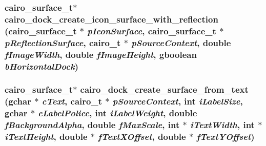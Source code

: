 \subsubsection{\setlength{\rightskip}{0pt plus 5cm}cairo\_\-surface\_\-t$\ast$ cairo\_\-dock\_\-create\_\-icon\_\-surface\_\-with\_\-reflection (cairo\_\-surface\_\-t $\ast$ {\em pIconSurface}, cairo\_\-surface\_\-t $\ast$ {\em pReflectionSurface}, cairo\_\-t $\ast$ {\em pSourceContext}, double {\em fImageWidth}, double {\em fImageHeight}, gboolean {\em bHorizontalDock})}\label{cairo-dock-surface-factory_8h_f291ea9a737e4c9f735517bedefbd6c2}


\subsubsection{\setlength{\rightskip}{0pt plus 5cm}cairo\_\-surface\_\-t$\ast$ cairo\_\-dock\_\-create\_\-surface\_\-from\_\-text (gchar $\ast$ {\em cText}, cairo\_\-t $\ast$ {\em pSourceContext}, int {\em iLabelSize}, gchar $\ast$ {\em cLabelPolice}, int {\em iLabelWeight}, double {\em fBackgroundAlpha}, double {\em fMaxScale}, int $\ast$ {\em iTextWidth}, int $\ast$ {\em iTextHeight}, double $\ast$ {\em fTextXOffset}, double $\ast$ {\em fTextYOffset})}\label{cairo-dock-surface-factory_8h_0dc49419d75c95644061ec7c90c570e4}


